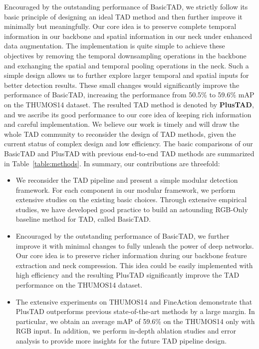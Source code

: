 \documentclass[a4paper,fleqn]{cas-dc}
\begin{document}
Encouraged by the outstanding performance of BasicTAD, we strictly follow its basic principle of designing an ideal TAD method and then further improve it minimally but meaningfully. Our core idea is to preserve complete temporal information in our backbone and spatial information in our neck under enhanced data augmentation. The implementation is quite simple to achieve these objectives by removing the temporal downsampling operations in the backbone and exchanging the spatial and temporal pooling operations in the neck. Such a simple design allows us to further explore larger temporal and spatial inputs for better detection results. These small changes would significantly improve the performance of BasicTAD, increasing the performance from 50.5\% to 59.6\% mAP on the THUMOS14 dataset. The resulted TAD method is denoted by \textbf{PlusTAD}, and we ascribe its good performance to our core idea of keeping rich information and careful implementation. We believe our work is timely and will draw the whole TAD community to reconsider the design of TAD methods, given the current status of complex design and low efficiency. The basic comparisons of our BasicTAD and PlusTAD with previous end-to-end TAD methods are summarized in Table~\ref{table:methods}. In summary, our contributions are threefold:
\begin{itemize}
    \item We reconsider the TAD pipeline and present a simple modular detection framework. For each component in our modular framework, we perform extensive studies on the existing basic choices. Through extensive empirical studies, we have developed good practice to build an astounding RGB-Only baseline method for TAD, called BasicTAD.
    \item Encouraged by the outstanding performance of BasicTAD, we further improve it with minimal changes to fully unleash the power of deep networks. Our core idea is to preserve richer information during our backbone feature extraction and neck compression. This idea could be easily implemented with high efficiency and the resulting PlusTAD significantly improve the TAD performance on the THUMOS14 dataset.
    \item The extensive experiments on THUMOS14 and FineAction demonstrate that PlusTAD outperforms previous state-of-the-art methods by a large margin. In particular, we obtain an average mAP of 59.6\% on the THUMOS14 only with RGB input. In addition, we perform in-depth ablation studies and error analysis to provide more insights for the future TAD pipeline design. 
\end{itemize}
\end{document}
